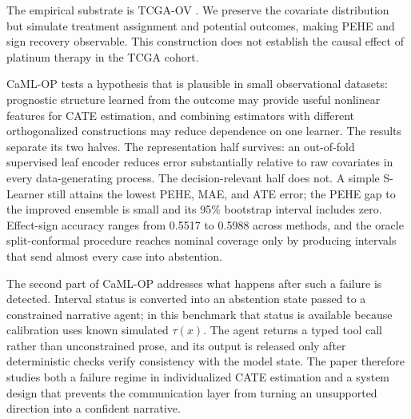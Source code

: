 \documentclass{article}
\begin{document}
The empirical substrate is TCGA-OV \citep{tcga2011}. We preserve the covariate distribution but simulate treatment assignment and potential outcomes, making PEHE and sign recovery observable. This construction does not establish the causal effect of platinum therapy in the TCGA cohort.

CaML-OP tests a hypothesis that is plausible in small observational datasets: prognostic structure learned from the outcome may provide useful nonlinear features for CATE estimation, and combining estimators with different orthogonalized constructions may reduce dependence on one learner. The results separate its two halves. The representation half survives: an out-of-fold supervised leaf encoder reduces error substantially relative to raw covariates in every data-generating process. The decision-relevant half does not. A simple S-Learner still attains the lowest PEHE, MAE, and ATE error; the PEHE gap to the improved ensemble is small and its 95\% bootstrap interval includes zero. Effect-sign accuracy ranges from 0.5517 to 0.5988 across methods, and the oracle split-conformal procedure reaches nominal coverage only by producing intervals that send almost every case into abstention.

The second part of CaML-OP addresses what happens after such a failure is detected. Interval status is converted into an abstention state passed to a constrained narrative agent; in this benchmark that status is available because calibration uses known simulated $\tau(x)$. The agent returns a typed tool call rather than unconstrained prose, and its output is released only after deterministic checks verify consistency with the model state. The paper therefore studies both a failure regime in individualized CATE estimation and a system design that prevents the communication layer from turning an unsupported direction into a confident narrative.
\end{document}
